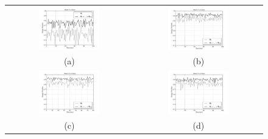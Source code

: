 \documentclass[12pt,a4paper]{article}
\begin{document}
\begin{figure}[h]
\begin{tabular}{cc}
 \includegraphics[width=0.5\textwidth]{./imgs/energy1.pdf} & \includegraphics[width=0.5\textwidth]{./imgs/energy2.pdf} \\
(a) & (b) \\
 \includegraphics[width=0.5\textwidth]{./imgs/energy3.pdf} & \includegraphics[width=0.5\textwidth]{./imgs/energy4.pdf} \\
(c) & (d) \\

\end{tabular}
\end{figure}
\end{document}
